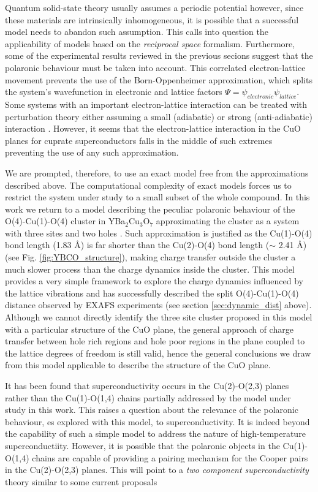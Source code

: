 Quantum solid-state theory usually assumes a periodic potential however, since these materials are intrinsically inhomogeneous, it is possible that a successful model needs to abandon such assumption. 
This calls into question the applicability of models based on the \textit{reciprocal space} formalism.
Furthermore, some of the experimental results reviewed in the previous secions suggest that the polaronic behaviour must be taken into account.
This correlated electron-lattice movement prevents the use of the Born-Oppenheimer approximation, which splits the system's wavefunction in electronic and lattice factors $\Psi = \psi_{electronic}\psi_{lattice}$.
Some systems with an important electron-lattice interaction can be treated with perturbation theory either assuming a small (adiabatic) or strong (anti-adiabatic) interaction \cite{?}. 
However, it seems that the electron-lattice interaction in the CuO planes for cuprate superconductors falls in the middle of such extremes \cite{MustredeLeon1992} preventing the use of any such approximation.

We are prompted, therefore, to use an exact model free from the approximations described above. 
The computational complexity of exact models forces us to restrict the system under study to a small subset of the whole compound.
In this work we return to a model describing the peculiar polaronic behaviour of the O(4)-Cu(1)-O(4) cluster in YBa$_{2}$Cu$_{3}$O$_{7}$ approximating the cluster as a system with three sites and two holes \cite{MustredeLeon1992}.
Such approximation is justified as the Cu(1)-O(4) bond length (1.83 \AA) is far shorter than the Cu(2)-O(4) bond length ($\sim$ 2.41 \AA) (see Fig. \ref{fig:YBCO_structure}), making charge transfer outside the cluster a much slower process than the charge dynamics inside the cluster. 
This model provides a very simple framework to explore the charge dynamics influenced by the lattice vibrations and has successfully described the split O(4)-Cu(1)-O(4) distance observed by EXAFS experiments (see section \ref{sec:dynamic_dist} above).
Although we cannot directly identify the three site cluster proposed in this model with a particular structure of the CuO plane, the general approach of charge transfer between hole rich regions and hole poor regions in the plane coupled to the lattice degrees of freedom is still valid, hence the general conclusions we draw from this model applicable to describe the structure of the CuO plane.

It has been found that superconductivity occurs in the Cu(2)-O(2,3) planes rather than the Cu(1)-O(1,4) chains partially addressed by the model under study in this work.
This raises a question about the relevance of the polaronic behaviour, es explored with this model, to superconductivity.
It is indeed beyond the capability of such a simple model to address the nature of high-temperature superconductiity.
However, it is possible that the polaronic objects in the Cu(1)-O(1,4) chains are capable of providing a pairing mechanism for the Cooper pairs in the Cu(2)-O(2,3) planes.
This will point to a \textit{two component superconductivity} theory similar to some current proposals \cite{?}

